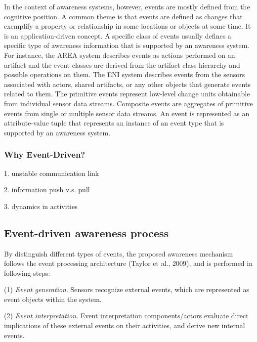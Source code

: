 In the context of awareness systems, however, events are mostly defined from the cognitive position. A common theme is that events are defined as changes that exemplify a property or relationship in some locations or objects at some time. It is an application-driven concept. A specific class of events usually defines a specific type of awareness information that is supported by an awareness system. For instance, the AREA system \cite{fuchs1999a} describes events as actions performed on an artifact and the event classes are derived from the artifact class hierarchy and possible operations on them. The ENI system \cite{gross2004a} describes events from the sensors associated with actors, shared artifacts, or any other objects that generate events related to them. The primitive events represent low-level change units obtainable from individual sensor data streams. Composite events are aggregates of primitive events from single or multiple sensor data streams. An event is represented as an attribute-value tuple that represents an instance of an event type that is supported by an awareness system.

\subsubsection{Why Event-Driven?} %
\label{ssub:why_event_driven_}

1. unstable communication link

2. information push v.s. pull

3. dynamics in activities


\subsection{Event-driven awareness process} %
\label{sub:event_driven_awareness_process}

By distinguish different types of events, the proposed awareness mechanism follows the event processing architecture (Taylor et al., 2009), and is performed in following steps: 

(1) \emph{Event generation}. Sensors recognize external events, which are represented as event objects within the system. 

(2) \emph{Event interpretation}. Event interpretation components/actors evaluate direct implications of these external events on their activities, and derive new internal events. 

